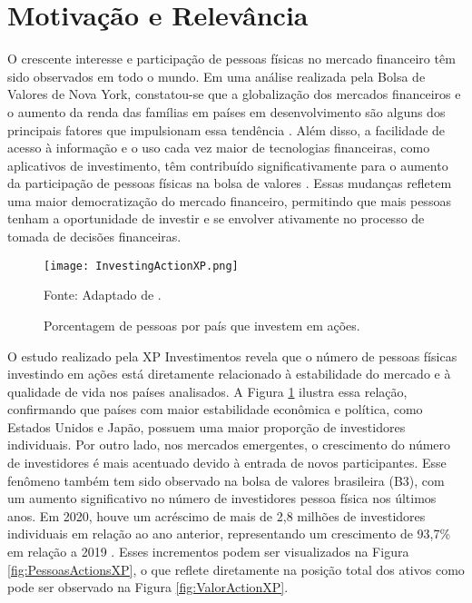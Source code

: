 \section{Motivação e Relevância}
\label{subsec:motivação}
O crescente interesse e participação de pessoas físicas no mercado financeiro têm sido observados em todo o mundo. Em uma análise realizada pela Bolsa de Valores de Nova York, constatou-se que a globalização dos mercados financeiros e o aumento da renda das famílias em países em desenvolvimento são alguns dos principais fatores que impulsionam essa tendência \cite{KANIEL_Individual}. Além disso, a facilidade de acesso à informação e o uso cada vez maior de tecnologias financeiras, como aplicativos de investimento, têm contribuído significativamente para o aumento da participação de pessoas físicas na bolsa de valores \cite{UNCTAD2020}. Essas mudanças refletem uma maior democratização do mercado financeiro, permitindo que mais pessoas tenham a oportunidade de investir e se envolver ativamente no processo de tomada de decisões financeiras.

\begin{figure}
    \caption{Porcentagem de pessoas por país que investem em ações.}
      \centering
      \texttt{[image: InvestingActionXP.png]} 
      
      Fonte: Adaptado de .
    \label{fig:investPerCountry}
\end{figure}

O estudo realizado pela XP Investimentos \cite{XP:2023} revela que o número de pessoas físicas investindo em ações está diretamente relacionado à estabilidade do mercado e à qualidade de vida nos países analisados. A Figura \ref{fig:investPerCountry} ilustra essa relação, confirmando que países com maior estabilidade econômica e política, como Estados Unidos e Japão, possuem uma maior proporção de investidores individuais. Por outro lado, nos mercados emergentes, o crescimento do número de investidores é mais acentuado devido à entrada de novos participantes. Esse fenômeno também tem sido observado na bolsa de valores brasileira (B3), com um aumento significativo no número de investidores pessoa física nos últimos anos. Em 2020, houve um acréscimo de mais de 2,8 milhões de investidores individuais em relação ao ano anterior, representando um crescimento de 93,7\% em relação a 2019 \cite{B3:2023}. Esses incrementos podem ser visualizados na Figura \ref{fig:PessoasActionsXP}, o que reflete diretamente na posição total dos ativos como pode ser observado na Figura \ref{fig:ValorActionXP}.

